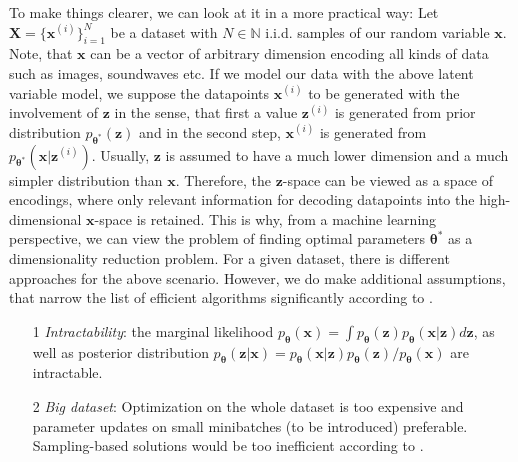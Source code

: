 \documentclass[12pt]{report}
\theoremstyle{definition}
\begin{document}
To make things clearer, we can look at it in a more practical way: Let $\mathbf{X} = \{ \mathbf{x}^{(i)}\}_{i=1}^N$ be a dataset with $N \in \mathbb{N}$ i.i.d. samples of our random variable $\mathbf{x}$. Note, that $\mathbf{x}$ can be a vector of arbitrary dimension encoding all kinds of data such as images, soundwaves etc. If we model our data with the above latent variable model, we suppose the datapoints $\mathbf{x}^{(i)}$ to be generated with the involvement of $\mathbf{z}$ in the sense, that first a value $\mathbf{z}^{(i)}$ is generated from prior distribution $p_{\mathbf{\theta^*}}(\mathbf{z})$ and in the second step, $\mathbf{x}^{(i)}$ is generated from $p_{\pmb{\theta}^*}(\mathbf{x}|\mathbf{z}^{(i)})$.
Usually, $\mathbf{z}$ is assumed to have a much lower dimension and a much simpler distribution than $\mathbf{x}$. Therefore, the $\mathbf{z}$-space can be viewed as a space of encodings, where only relevant information for decoding datapoints into the high-dimensional $\mathbf{x}$-space is retained. This is why, from a machine learning perspective, we can view the problem of finding optimal parameters $\pmb{\theta}^*$ as a dimensionality reduction problem.
For a given dataset, there is different approaches for the above scenario. However, we do make additional assumptions, that narrow the list of efficient algorithms significantly according to \cite{kingma1}.

\begin{itemize}
	\item[1] \emph{Intractability}: the marginal likelihood $p_{\pmb{\theta}}(\mathbf{x}) = \int p_{\pmb{\theta}}(\mathbf{z}) p_{\pmb{\theta}}(\mathbf{x}|\mathbf{z}) d \mathbf{z}$, as well as posterior distribution $p_{\pmb{\theta}}(\mathbf{z}|\mathbf{x}) = p_{\pmb{\theta}}(\mathbf{x}|\mathbf{z}) p_{\pmb{\theta}}(\mathbf{z}) / p_{\pmb{\theta}}(\mathbf{x})$ are intractable.
	\item[2] \emph{Big dataset}: Optimization on the whole dataset is too expensive and parameter updates on small minibatches (to be introduced) preferable. Sampling-based solutions would be too inefficient according to \cite{kingma1}.
\end{itemize}
\end{document}
